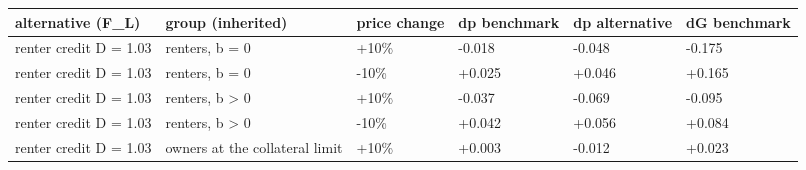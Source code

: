 \begingroup\small
\setlength{\tabcolsep}{3pt}
\renewcommand{\arraystretch}{1.04}
\begin{tabularx}{\linewidth}{XXXXXX}
\toprule
alternative (F\_L) & group (inherited) & price change & dp benchmark & dp alternative & dG benchmark \\
\midrule
renter credit D = 1.03 & renters, b = 0 & +10\% & -0.018 & -0.048 & -0.175 \\
renter credit D = 1.03 & renters, b = 0 & -10\% & +0.025 & +0.046 & +0.165 \\
renter credit D = 1.03 & renters, b \textgreater{} 0 & +10\% & -0.037 & -0.069 & -0.095 \\
renter credit D = 1.03 & renters, b \textgreater{} 0 & -10\% & +0.042 & +0.056 & +0.084 \\
renter credit D = 1.03 & owners at the collateral limit & +10\% & +0.003 & -0.012 & +0.023 \\
\bottomrule
\end{tabularx}
\endgroup
